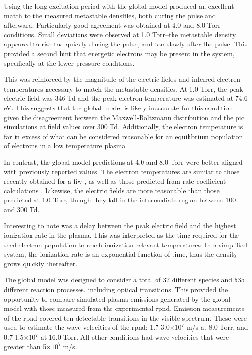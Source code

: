 Using the long excitation period with the global model produced an excellent
match to the measured metastable densities, both during the pulse and afterward.
Particularly good agreement was obtained at 4.0 and 8.0 Torr conditions. Small
deviations were observed at 1.0 Torr--the metastable density appeared to rise
too quickly during the pulse, and too slowly after the pulse. This provided a
second hint that energetic electrons may be present in the system, specifically
at the lower pressure conditions.

This was reinforced by the magnitude of the electric fields and inferred
electron temperatures necessary to match the metastable densities. At 1.0 Torr,
the peak electric field was 346 Td and the peak electron temperature was
estimated at 74.6 eV. This suggests that the global model is likely inaccurate
for this condition given the disagreement between the Maxwell-Boltzmann
distribution and the \acs{pic} simulations at field values over 300 Td.
Additionally, the electron temperature is far in excess of what can be
considered reasonable for an equilibrium population of electrons in a low
temperature plasma.

In contrast, the global model predictions at 4.0 and 8.0 Torr were better
aligned with previously reported values. The electron temperatures are similar
to those recently obtained for a \acs{fiw} \cite{Takashima2011}, as well as
those predicted from rate coefficient calculations \cite{Aleksandrov2007}.
Likewise, the electric fields are more reasonable than those predicted at 1.0
Torr, though they fall in the intermediate region between 100 and 300 Td.

Interesting to note was a delay between the peak electric field and the highest
ionization rate in the plasma. This was interpreted as the time required for the
seed electron population to reach ionization-relevant temperatures. In a
simplified system, the ionization rate is an exponential function of time,
thus the density grows quickly thereafter.

The global model was designed to consider a total of 32 different species and
535 different reaction processes, including optical transitions. This provided
the opportunity to compare simulated plasma emissions generated by the global
model with those measured from the experimental \acs{rpnd}. Emission
measurements of the \acs{rpnd} covered ten detectable transitions in the
visible spectrum. These were used to estimate the wave velocities of the
\acs{rpnd}: 1.7-3.0$\times10^7$ m/s at 8.0 Torr, and 0.7-1.5$\times10^7$ at 16.0
Torr. All other conditions had wave velocities that were greater than
5$\times10^7$ m/s.

